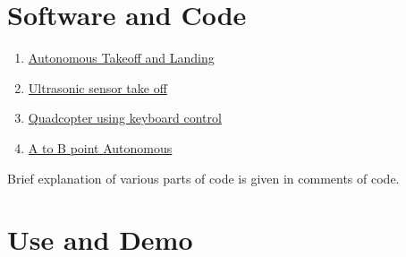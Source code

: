\documentclass[a4paper,12pt,oneside]{book}
\begin{document}
\section{Software and Code}
\begin{enumerate}
  \item \href{https://github.com/eYSIP-2016/Autonomous-Drone/blob/master/code/Autonomus%20take%20off%20and%20landing.py}{Autonomous Takeoff and Landing}
  
  \item \href{https://github.com/eYSIP-2016/Autonomous-Drone/blob/master/code/Ultrasonic%20sensor%20take%20off.py}{Ultrasonic sensor take off}
  
  \item \href{https://github.com/eYSIP-2016/Autonomous-Drone/blob/master/code/quad%20control%20with%20keyboard.py}{Quadcopter using keyboard control}
  
  \item \href{https://github.com/eYSIP-2016/Autonomous-Drone/blob/master/code/A_to_B%20point%20Autonomous.py}{A to B point Autonomous}
\end{enumerate}
 

Brief explanation of various parts of code is given in comments of code.
\newpage
\section{Use and Demo}
\end{document}
